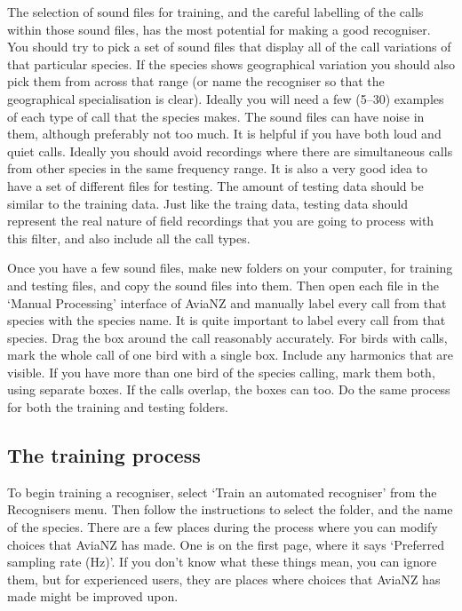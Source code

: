 \documentclass{article}
\begin{document}
The selection of sound files for training, and the careful labelling of the calls within those sound files, has the most potential for making a good recogniser. You should try to pick a set of sound files that display all of the call variations of that particular species. If the species shows geographical variation you should also pick them from across that range (or name the recogniser so that the geographical specialisation is clear).  Ideally you will need a few (5--30) examples of each type of call that the species makes. The sound files can have noise in them, although preferably not too much. It is helpful if you have both loud and quiet calls. Ideally you should avoid recordings where there are simultaneous calls from other species in the same frequency range. It is also a very good idea to have a set of different files for testing. The amount of testing data should be similar to the training data. Just like the traing data, testing data should represent the real nature of field recordings that you are going to process with this filter, and also include all the call types.

Once you have a few sound files, make new folders on your computer, for training and testing files, and copy the sound files into them. Then open each file in the `Manual Processing' interface of AviaNZ and manually label every call from that species with the species name. It is quite important to label every call from that species. Drag the box around the call reasonably accurately. For birds with calls, mark the whole call of one bird with a single box. Include any harmonics that are visible. If you have more than one bird of the species calling, mark them both, using separate boxes. If the calls overlap, the boxes can too. Do the same process for both the training and testing folders.

\subsection{The training process}

To begin training a recogniser, select `Train an automated recogniser' from the Recognisers menu. Then follow the instructions to select the folder, and the name of the species. There are a few places during the process where you can modify choices that AviaNZ has made. One is on the first page, where it says `Preferred sampling rate (Hz)'. If you don't know what these things mean, you can ignore them, but for experienced users, they are places where choices that AviaNZ has made might be improved upon. 
\end{document}
